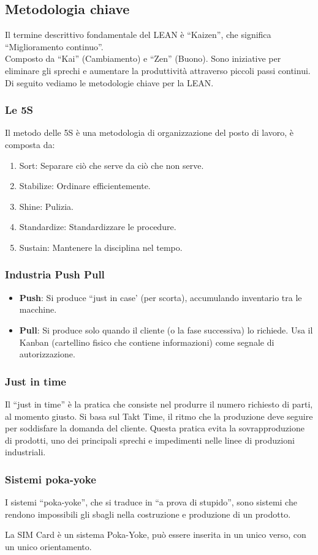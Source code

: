 \subsection{Metodologia chiave}
Il termine descrittivo fondamentale del LEAN è ``Kaizen'', che significa ``Miglioramento continuo''. \\
Composto da ``Kai'' (Cambiamento) e ``Zen'' (Buono). Sono iniziative per eliminare gli sprechi e aumentare la produttività attraverso piccoli passi continui.
Di seguito vediamo le metodologie chiave per la LEAN.
\subsubsection{Le 5S}
Il metodo delle 5S è una metodologia di organizzazione del posto di lavoro, è composta da:
\begin{enumerate}
    \item Sort: Separare ciò che serve da ciò che non serve.
    \item Stabilize: Ordinare efficientemente.
    \item Shine: Pulizia.
    \item Standardize: Standardizzare le procedure.
    \item Sustain: Mantenere la disciplina nel tempo.
\end{enumerate}
\subsubsection{Industria Push Pull}
\begin{itemize}
    \item \textbf{Push}: Si produce ``just in case' (per scorta), accumulando inventario tra le macchine.
    \item \textbf{Pull}: Si produce solo quando il cliente (o la fase successiva) lo richiede. Usa il Kanban (cartellino fisico che contiene informazioni) come segnale di autorizzazione.
\end{itemize}
\subsubsection{Just in time}
Il ``just in time'' è la pratica che consiste nel produrre il numero richiesto di parti, al momento giusto. Si basa sul Takt Time, il ritmo che la produzione deve seguire per soddisfare la domanda del cliente.
Questa pratica evita la sovrapproduzione di prodotti, uno dei principali sprechi e impedimenti nelle linee di produzioni industriali.
\subsubsection{Sistemi poka-yoke}
I sistemi ``poka-yoke'', che si traduce in ``a prova di stupido'', sono sistemi che rendono impossibili gli sbagli nella costruzione e produzione di un prodotto.
\begin{example}
    La SIM Card è un sistema Poka-Yoke, può essere inserita in un unico verso, con un unico orientamento.
\end{example}

